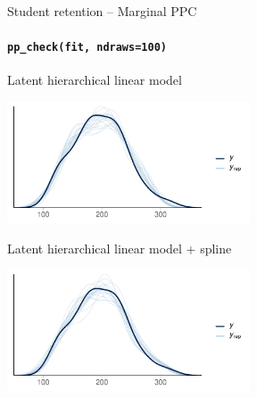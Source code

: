 \documentclass[t]{beamer}
\begin{document}
\begin{frame}[fragile]{Student retention -- Marginal PPC}
\framesubtitle{\texttt{pp\_check(fit, ndraws=100)}}

  
\vspace{-0.75\baselineskip}  
Latent hierarchical linear model\\  
  \begin{minipage}[t][3.6cm][t]{1.0\linewidth}
    \includegraphics[height=3.6cm]{student_retention_lbinom_ppc_dens_overlay.pdf}
  \end{minipage}
  
\vspace{-0.5\baselineskip}  
Latent hierarchical linear model + spline\\  
  \begin{minipage}[t][3.6cm][t]{1.0\linewidth}
    \includegraphics[height=3.6cm]{student_retention_sbinom_ppc_dens_overlay.pdf}
  \end{minipage}  

\end{frame}
\end{document}
